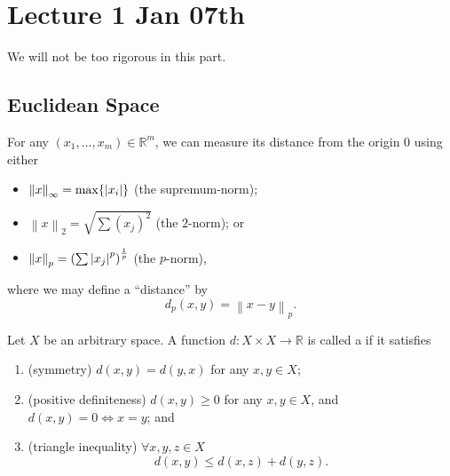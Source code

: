 \documentclass[notoc,notitlepage]{tufte-book}
\newcommand{\norm}[1]{\left\| #1 \right\|}
\begin{document}



\chapter{Lecture 1 Jan 07th}%
\label{chp:lecture_1_jan_07th}

We will not be too rigorous in this part.

\section{Euclidean Space}%
\label{sec:euclidean_space}

For any $(x_1, \ldots, x_m) \in \mathbb{R}^m$, we can measure its distance from the origin $0$ using either
\begin{itemize}
  \item $\norm{x}_\infty = \max \{ \abs{ x_i } \}$ (the supremum-norm);
  \item $\norm{x}_2 = \sqrt{ \sum (x_j)^2 }$ (the $2$-norm); or
  \item $\norm{x}_p = \left( \sum \abs{ x_j }^p \right)^\frac{1}{p}$ (the $p$-norm),
\end{itemize}
where we may define a ``distance'' by
\begin{equation*}
  d_p(x, y) = \norm{ x - y }_p.
\end{equation*}

\begin{defn}[Metric]\label{defn:metric}
  Let $X$ be an arbitrary space. A function $d : X \times X \to \mathbb{R}$ is called a  if it satisfies
  \begin{enumerate}
    \item (symmetry) $d(x, y) = d(y, x)$ for any $x, y \in X$;
    \item (positive definiteness) $d(x, y) \geq 0$ for any $x, y \in X$, and $d(x, y) = 0 \iff x = y$; and
    \item (triangle inequality) $\forall x, y, z \in X$
      \begin{equation*}
        d(x, y) \leq d(x, z) + d(y, z).
      \end{equation*}
  \end{enumerate}
\end{defn}
\end{document}
